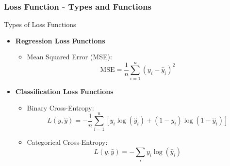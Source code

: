\documentclass[aspectratio=169]{beamer}
\begin{document}
\begin{frame}[fragile]
    \frametitle{Loss Function - Types and Functions}
    \begin{block}{Types of Loss Functions}
        \begin{itemize}
            \item \textbf{Regression Loss Functions}
                \begin{itemize}
                    \item Mean Squared Error (MSE):
                    \begin{equation}
                         \text{MSE} = \frac{1}{n} \sum_{i=1}^{n} (y_i - \hat{y}_i)^2
                    \end{equation}
                \end{itemize}
            \item \textbf{Classification Loss Functions}
                \begin{itemize}
                    \item Binary Cross-Entropy:
                    \begin{equation}
                        L(y, \hat{y}) = -\frac{1}{n} \sum_{i=1}^{n} [y_i \log(\hat{y}_i) + (1 - y_i) \log(1 - \hat{y}_i)]
                    \end{equation}
                    \item Categorical Cross-Entropy:
                    \begin{equation}
                        L(y, \hat{y}) = -\sum_{i} y_i \log(\hat{y}_i)
                    \end{equation}
                \end{itemize}
        \end{itemize}
    \end{block}
\end{frame}
\end{document}
